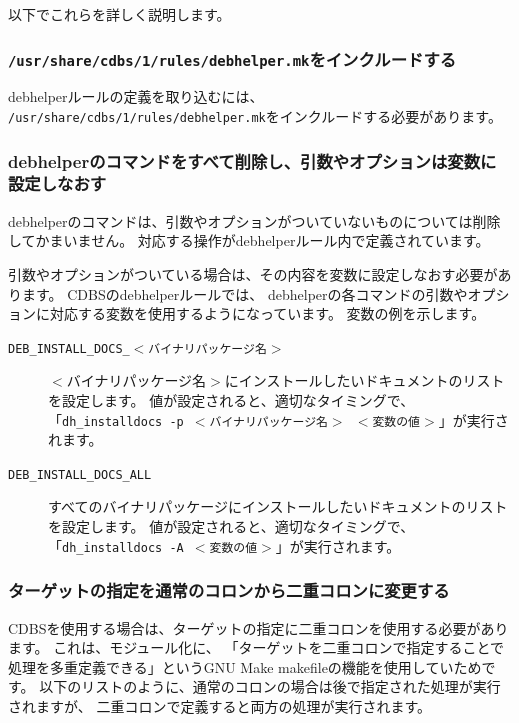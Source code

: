 \documentclass[mingoth,a4paper]{jsarticle}
\begin{document}
以下でこれらを詳しく説明します。

\subsubsection{\texttt{/usr/share/cdbs/1/rules/debhelper.mk}をインクルードする}

debhelperルールの定義を取り込むには、
\texttt{/usr/share/cdbs/1/rules/debhelper.mk}をインクルードする必要があります。

\subsubsection{debhelperのコマンドをすべて削除し、引数やオプションは変数に設定しなおす}

debhelperのコマンドは、引数やオプションがついていないものについては削除してかまいません。
対応する操作がdebhelperルール内で定義されています。

引数やオプションがついている場合は、その内容を変数に設定しなおす必要があります。
CDBSのdebhelperルールでは、
debhelperの各コマンドの引数やオプションに対応する変数を使用するようになっています。
変数の例を示します。

\begin{description}
 \item[\texttt{DEB\_INSTALL\_DOCS\_$<$バイナリパッケージ名$>$}]
    $<$バイナリパッケージ名$>$にインストールしたいドキュメントのリストを設定します。
    値が設定されると、適切なタイミングで、
    「\texttt{dh\_installdocs -p $<$バイナリパッケージ名$>$ $<$変数の値$>$}」が実行されます。
 \item[\texttt{DEB\_INSTALL\_DOCS\_ALL}]
    すべてのバイナリパッケージにインストールしたいドキュメントのリストを設定します。
    値が設定されると、適切なタイミングで、
    「\texttt{dh\_installdocs -A $<$変数の値$>$}」が実行されます。
\end{description}

\subsubsection{ターゲットの指定を通常のコロンから二重コロンに変更する}

CDBSを使用する場合は、ターゲットの指定に二重コロンを使用する必要があります。
これは、モジュール化に、
「ターゲットを二重コロンで指定することで処理を多重定義できる」というGNU Make makefileの機能を使用していためです。
以下のリストのように、通常のコロンの場合は後で指定された処理が実行されますが、
二重コロンで定義すると両方の処理が実行されます。
\end{document}
